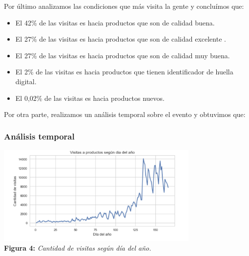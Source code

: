 \documentclass[titlepage,a4paper]{article}
\begin{document}
	Por último analizamos las condiciones que más visita la gente y concluímos que:
	\begin{itemize}
    \item El 42\% de las visitas es hacia productos que son de calidad buena.
    \item El 27\% de las visitas es hacia productos que son de calidad excelente .
    \item El 27\% de las visitas es hacia productos que son de calidad muy buena.
        \item El 2\% de las visitas es hacia  productos que tienen identificador de huella digital. 
        	\item El 0,02\%  de las visitas es hacia  productos nuevos.    
	\end{itemize}
	Por otra parte, realizamos un análisis temporal sobre el evento y obtuvimos que:
	
	\subsubsection{Análisis temporal}
	\begin{center}
	\includegraphics[width=10cm]{VisitasAProductosSegunDiaAnio.jpg}\\
	\textbf{Figura 4:}  \textit{Cantidad de visitas según día del año.  }
	\end{center}
\end{document}
